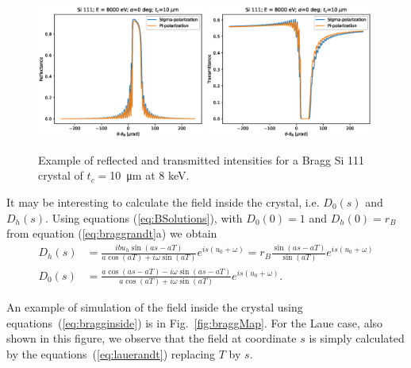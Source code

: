 \documentclass[preprint]{iucr}              %
\begin{document}
\begin{figure}\label{fig:braggProfiles}
    \centering
    \includegraphics[width=0.49\textwidth]{figures/Bragg_1.eps}
    \includegraphics[width=0.49\textwidth]{figures/Bragg_2.eps}
    \caption{Example of reflected and transmitted intensities for a Bragg Si 111 crystal of $t_c=$\SI{10}{\micro\meter} at 8 keV. }
\end{figure}

It may be interesting to calculate the field inside the crystal, i.e. $D_0(s)$ and $D_h(s)$. Using equations (\ref{eq:BSolutions}), with $D_0(0)=1$ and $D_h(0)=r_B$ from equation (\ref{eq:braggrandt}a) we obtain
\begin{subequations}\label{eq:bragginside}
\begin{align}
D_h(s)&=\frac{i b u_h \sin(as - aT)}{a \cos(aT) + i \omega \sin(aT)} e^{is(u_0+\omega)} 
= r_B \frac{\sin(as - aT)}{\sin(aT)} e^{is(u_0+\omega)}\\
D_0(s)&= \frac{a \cos(as-aT) - i \omega \sin(as-aT)}{a \cos(aT) + i \omega \sin(aT)} e^{is(u_0+\omega)}.
\end{align}
\end{subequations}

An example of simulation of the field inside the crystal using equations~(\ref{eq:bragginside}) is in Fig.~\ref{fig:braggMap}. For the Laue case, also shown in this figure, we observe that the field at coordinate $s$ is simply calculated by the equations~(\ref{eq:lauerandt}) replacing $T$ by $s$.
\end{document}
